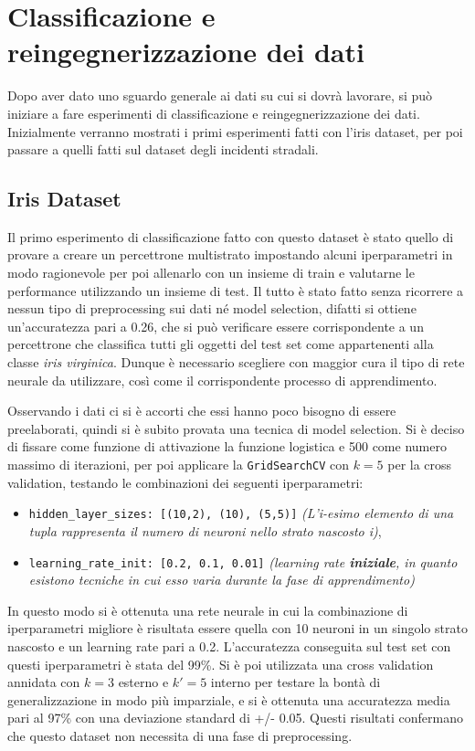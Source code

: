 \documentclass[12pt, twoside, letterpaper]{report}
\begin{document}
	\section{Classificazione e reingegnerizzazione dei dati} 
		Dopo aver dato uno sguardo generale ai dati su cui si dovrà lavorare, si può iniziare a fare esperimenti di classificazione e reingegnerizzazione dei dati. Inizialmente verranno mostrati i primi esperimenti fatti con l'iris dataset, per poi passare a quelli fatti sul dataset degli incidenti stradali. 
		
		\subsection{Iris Dataset}
			Il primo esperimento di classificazione fatto con questo dataset è stato quello di provare a creare un percettrone multistrato impostando alcuni iperparametri in modo ragionevole per poi allenarlo con un insieme di train e valutarne le performance utilizzando un insieme di test. Il tutto è stato fatto senza ricorrere a nessun tipo di preprocessing sui dati né model selection, difatti si ottiene un'accuratezza pari a 0.26, che si può verificare essere corrispondente a un percettrone che classifica tutti gli oggetti del test set come appartenenti alla classe \textit{iris virginica}. Dunque è necessario scegliere con maggior cura il tipo di rete neurale da utilizzare, così come il corrispondente processo di apprendimento. 



			Osservando i dati ci si è accorti che essi hanno poco bisogno di essere preelaborati, quindi si è subito provata una tecnica di model selection. Si è deciso di fissare come funzione di attivazione la funzione logistica e 500 come numero massimo di iterazioni, per poi applicare la \texttt{GridSearchCV} con $k=5$ per la cross validation, testando le combinazioni dei seguenti iperparametri:
			\begin{itemize}
				\item \texttt{hidden\_layer\_sizes: [(10,2), (10), (5,5)]} \textit{(L'i-esimo elemento di una tupla rappresenta il numero di neuroni nello strato nascosto i)},
	    		\item \texttt{learning\_rate\_init: [0.2, 0.1, 0.01]} \textit{(learning rate \textbf{iniziale}, in quanto esistono tecniche in cui esso varia durante la fase di apprendimento)}
			\end{itemize}
			In questo modo si è ottenuta una rete neurale in cui la combinazione di iperparametri migliore è risultata essere quella con 10 neuroni in un singolo strato nascosto e un learning rate pari a 0.2. L'accuratezza conseguita sul test set con questi iperparametri è  stata del 99\%. Si è poi utilizzata una cross validation annidata con $k = 3$ esterno e $k' = 5$  interno per testare la bontà di generalizzazione in modo più imparziale, e si è ottenuta una accuratezza media pari al 97\% con una deviazione standard di +/- 0.05. Questi risultati confermano che questo dataset non necessita di una fase di preprocessing.
		
\end{document}
